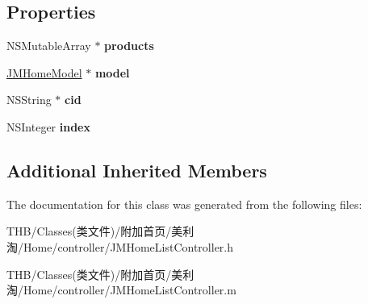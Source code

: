 \subsection*{Properties}
\begin{DoxyCompactItemize}
\item 
\mbox{\label{interface_j_m_home_list_controller_a415f2c642b1414e06a3ef928012f9d1d}} 
N\+S\+Mutable\+Array $\ast$ {\bfseries products}
\item 
\mbox{\label{interface_j_m_home_list_controller_a4c7c4f8420e3a739155fd56842ec427e}} 
\mbox{\hyperlink{interface_j_m_home_model}{J\+M\+Home\+Model}} $\ast$ {\bfseries model}
\item 
\mbox{\label{interface_j_m_home_list_controller_a60514d0035ff7066be3cc9bb6b95fbce}} 
N\+S\+String $\ast$ {\bfseries cid}
\item 
\mbox{\label{interface_j_m_home_list_controller_a5a6aa399fd3af985de50d97de3695eaa}} 
N\+S\+Integer {\bfseries index}
\end{DoxyCompactItemize}
\subsection*{Additional Inherited Members}


The documentation for this class was generated from the following files\+:\begin{DoxyCompactItemize}
\item 
T\+H\+B/\+Classes(类文件)/附加首页/美利淘/\+Home/controller/J\+M\+Home\+List\+Controller.\+h\item 
T\+H\+B/\+Classes(类文件)/附加首页/美利淘/\+Home/controller/J\+M\+Home\+List\+Controller.\+m\end{DoxyCompactItemize}
